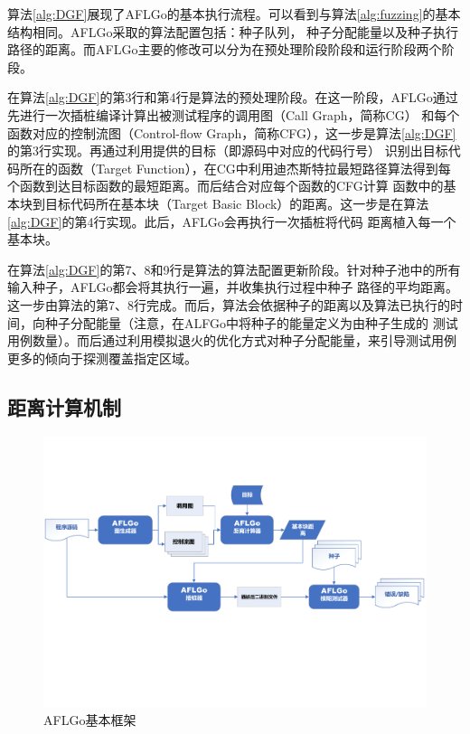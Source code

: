 \documentclass[bachelor]{njupthesis}
\begin{document}
算法\ref{alg:DGF}展现了AFLGo的基本执行流程。可以看到与算法\ref{alg:fuzzing}的基本结构相同。AFLGo采取的算法配置包括：种子队列，
种子分配能量以及种子执行路径的距离。而AFLGo主要的修改可以分为在预处理阶段阶段和运行阶段两个阶段。

在算法\ref{alg:DGF}的第3行和第4行是算法的预处理阶段。在这一阶段，AFLGo通过先进行一次插桩编译计算出被测试程序的调用图（Call Graph，简称CG）
和每个函数对应的控制流图（Control-flow Graph，简称CFG），这一步是算法\ref{alg:DGF}的第3行实现。再通过利用提供的目标（即源码中对应的代码行号）
识别出目标代码所在的函数（Target Function），在CG中利用迪杰斯特拉最短路径算法得到每个函数到达目标函数的最短距离。而后结合对应每个函数的CFG计算
函数中的基本块到目标代码所在基本块（Target Basic Block）的距离。这一步是在算法\ref{alg:DGF}的第4行实现。此后，AFLGo会再执行一次插桩将代码
距离植入每一个基本块。

在算法\ref{alg:DGF}的第7、8和9行是算法的算法配置更新阶段。针对种子池中的所有输入种子，AFLGo都会将其执行一遍，并收集执行过程中种子 路径的平均距离。
这一步由算法的第7、8行完成。而后，算法会依据种子的距离以及算法已执行的时间，向种子分配能量（注意，在ALFGo中将种子的能量定义为由种子生成的
测试用例数量）。而后通过利用模拟退火的优化方式对种子分配能量，来引导测试用例更多的倾向于探测覆盖指定区域。

\subsection{距离计算机制}
\begin{figure}[htbp]
	\centering
	\includegraphics[width=1\textwidth]{pic/AFLGo.pdf}
	\caption{AFLGo基本框架}
 	\label{pic:AFLGo}
\end{figure}
\end{document}
